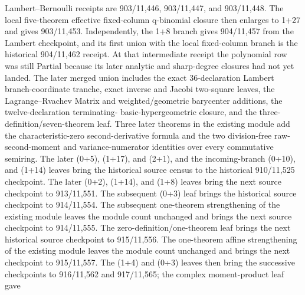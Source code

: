 \documentclass[11pt,oneside]{article}
\theoremstyle{definition}
\theoremstyle{remark}
\begin{document}
Lambert--Bernoulli receipts are 903/11,446, 903/11,447, and 903/11,448.
The local five-theorem effective fixed-column q-binomial closure then enlarges
 to 1+27 and gives 903/11,453.
Independently, the 1+8
 branch gives 904/11,457 from the
Lambert checkpoint, and its first union with the local fixed-column branch is
the historical 904/11,462 receipt.  At that intermediate receipt the
polynomial row was still Partial because its later analytic and sharp-degree
closures had not yet landed.  The later merged
union includes the exact 36-declaration Lambert branch-coordinate tranche,
exact inverse and Jacobi two-square leaves, the Lagrange--Rvachev Matrix and
weighted/geometric barycenter additions, the twelve-declaration terminating-
basic-hypergeometric closure, and the three-definition/seven-theorem
 leaf.  Three later theorems in the
existing  module add the
characteristic-zero second-derivative formula and the two division-free raw-
second-moment and variance-numerator identities over every commutative
semiring.  The later  (0+5),
 (1+17), and
 (2+1), and
the incoming-branch  (0+10), and
 (1+14) leaves bring the historical source census to
the historical 910/11,525 checkpoint.  The later
 (0+2),
 (1+14), and
 (1+8) leaves bring the next
source checkpoint to 913/11,551.  The subsequent
 (0+3) leaf brings the historical
source checkpoint to 914/11,554.  The subsequent one-theorem strengthening
of the existing  module leaves the module
count unchanged and brings the next source checkpoint to 914/11,555.  The
zero-definition/one-theorem
 leaf brings the next
historical source checkpoint to 915/11,556.  The one-theorem affine
strengthening of the existing  module
leaves the module count unchanged and brings the next checkpoint to
915/11,557.  The  (1+4) and
 (0+3) leaves then bring the successive
checkpoints to 916/11,562 and 917/11,565; the complex moment-product leaf gave
\end{document}

